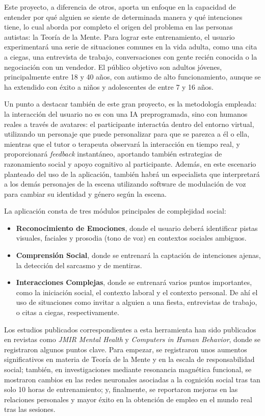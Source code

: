 \documentclass[12pt,twoside,titlepage]{report}
\begin{document}
\begin{enumerate}[label=\textbf{\arabic*.}, leftmargin=1.5cm, itemsep=0.5em]
  Este proyecto, a diferencia de otros, aporta un enfoque en la capacidad de entender por qué alguien se siente de determinada manera y qué intenciones tiene, lo cual aborda por completo el origen del problema en las personas autistas: la Teoría de la Mente.
Para lograr este entrenamiento, el usuario experimentará una serie de situaciones comunes en la vida adulta, como una cita a ciegas, una entrevista de trabajo, conversaciones con gente recién conocida o la negociación con un vendedor.
El público objetivo son adultos jóvenes, principalmente entre 18 y 40 años, con autismo de alto funcionamiento, aunque se ha extendido con éxito a niños y adolescentes de entre 7 y 16 años.

  Un punto a destacar también de este gran proyecto, es la metodología empleada: la interacción del usuario no es con una IA preprogramada, sino con humanos reales a través de avatares: el participante interactúa dentro del entorno virtual, utilizando un personaje que puede personalizar para que se parezca a él o ella, mientras que el tutor o terapeuta observará la interacción en tiempo real, y proporcionará \textit{feedback} instantáneo, aportando también estrategias de razonamiento social y apoyo cognitivo al participante.
Además, en este escenario planteado del uso de la aplicación, también habrá un especialista que interpretará a los demás personajes de la escena utilizando software de modulación de voz para cambiar su identidad y género según la escena.

  La aplicación consta de tres módulos principales de complejidad social:
  \begin{itemize}[leftmargin=1.5cm, labelsep=0.5em, itemsep=0.5em]
        \item \textbf{Reconocimiento de Emociones}, donde el usuario deberá identificar pistas visuales, faciales y prosodia (tono de voz) en contextos sociales ambiguos.
        \item \textbf{Comprensión Social}, donde se entrenará la captación de intenciones ajenas, la detección del sarcasmo y de mentiras.
        \item \textbf{Interacciones Complejas}, donde se entrenará varios puntos importantes, como la iniciación social, el contexto laboral y el contexto personal.
De ahí el uso de situaciones como invitar a alguien a una fiesta, entrevistas de trabajo, o citas a ciegas, respectivamente.
    \end{itemize}

    Los estudios publicados correspondientes a esta herramienta han sido publicados en revistas como \textit{JMIR Mental Health} y \textit{Computers in Human Behavior}, donde se registraron algunos puntos clave.
Para empezar, se registraron unos aumentos significativos en materia de Teoría de la Mente y en la escala de responsabilidad social; también, en investigaciones mediante resonancia magnética funcional, se mostraron cambios en las redes neuronales asociadas a la cognición social tras tan solo 10 horas de entrenamiento; y, finalmente, se reportaron mejoras en las relaciones personales y mayor éxito en la obtención de empleo en el mundo real tras las sesiones.


\end{enumerate}
\end{document}
